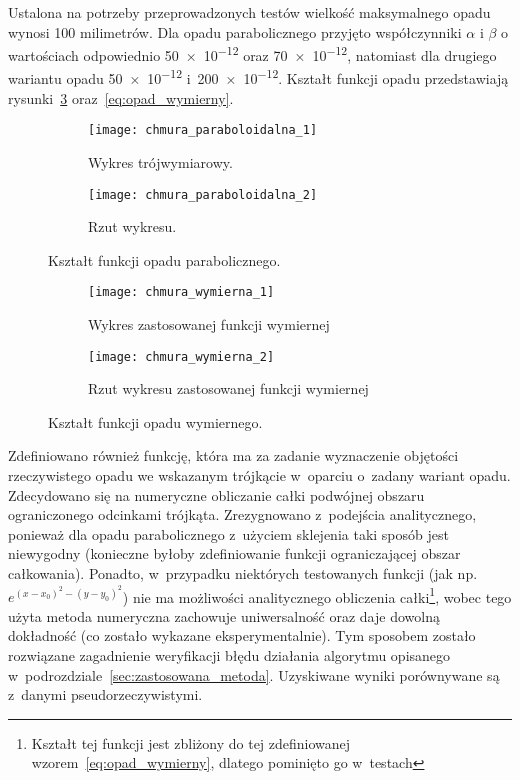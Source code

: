 Ustalona na potrzeby przeprowadzonych testów wielkość maksymalnego opadu wynosi 100 milimetrów. Dla opadu parabolicznego przyjęto współczynniki $\alpha$ i $\beta$ o wartościach odpowiednio \num{50e-12} oraz \num{70e-12}, natomiast dla drugiego wariantu opadu \num{50e-12} i~\num{200e-12}. Kształt funkcji opadu przedstawiają rysunki~\ref{fig:opad_paraboliczny} oraz~\ref{eq:opad_wymierny}.

\begin{figure}[!ht]
\centering
	\begin{subfigure}{1\textwidth}
		\centering
		\texttt{[image: chmura\_paraboloidalna\_1]}
		\caption{Wykres trójwymiarowy.}
		\label{fig:parabola_3d}
	\end{subfigure}	
	\begin{subfigure}{1\textwidth}
		\centering
		\texttt{[image: chmura\_paraboloidalna\_2]}
		\caption{Rzut wykresu.}
		\label{fig:parabola_2d}
	\end{subfigure}	

\label{fig:opad_paraboliczny}
\caption{Kształt funkcji opadu parabolicznego.}
\end{figure}

\begin{figure}[!ht]
	\label{fig:opad_wymierny}
	\begin{subfigure}{1\textwidth}
		\centering
		\texttt{[image: chmura\_wymierna\_1]}
		\caption{Wykres zastosowanej funkcji wymiernej}
		\label{fig:wymierna_3d}
	\end{subfigure}	
	\begin{subfigure}{1\textwidth}
		\centering
		\texttt{[image: chmura\_wymierna\_2]}
		\caption{Rzut wykresu zastosowanej funkcji wymiernej}
		\label{fig:wymierna_2d}
	\end{subfigure}	
	\caption{Kształt funkcji opadu wymiernego.}
\end{figure}

Zdefiniowano również funkcję, która ma za zadanie wyznaczenie objętości rzeczywistego opadu we wskazanym trójkącie w~oparciu o~zadany wariant opadu. Zdecydowano się na numeryczne obliczanie całki podwójnej obszaru ograniczonego odcinkami trójkąta. Zrezygnowano z~podejścia analitycznego, ponieważ dla opadu parabolicznego z~użyciem sklejenia taki sposób jest niewygodny (konieczne byłoby zdefiniowanie funkcji ograniczającej obszar całkowania). Ponadto, w~przypadku niektórych testowanych funkcji (jak np. $e^{(x-x_0)^2 - (y-y_0)^2}$) nie ma możliwości analitycznego obliczenia całki\footnote{Kształt tej funkcji jest zbliżony do tej zdefiniowanej wzorem~\ref{eq:opad_wymierny}, dlatego pominięto go w~testach}, wobec tego użyta metoda numeryczna zachowuje uniwersalność oraz daje dowolną dokładność (co zostało wykazane eksperymentalnie). Tym sposobem zostało rozwiązane zagadnienie weryfikacji błędu działania algorytmu opisanego w~podrozdziale~\ref{sec:zastosowana_metoda}. Uzyskiwane wyniki porównywane są z~danymi pseudorzeczywistymi.



